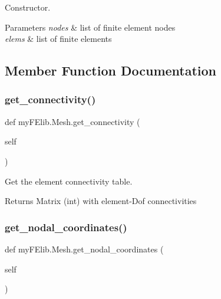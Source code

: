 Constructor. 


\begin{DoxyParams}{Parameters}
{\em nodes} & list of finite element nodes \\
\hline
{\em elems} & list of finite elements \\
\hline
\end{DoxyParams}


\subsection{Member Function Documentation}
\mbox{\label{classmyFElib_1_1Mesh_ac4e674a719553db6c87ef5ef354fcec2}} 
\subsubsection{\texorpdfstring{get\+\_\+connectivity()}{get\_connectivity()}}
{\footnotesize\ttfamily def my\+F\+Elib.\+Mesh.\+get\+\_\+connectivity (\begin{DoxyParamCaption}\item[{}]{self }\end{DoxyParamCaption})}



Get the element connectivity table. 

\begin{DoxyReturn}{Returns}
Matrix (int) with element-\/\+Dof connectivities 
\end{DoxyReturn}
\mbox{\label{classmyFElib_1_1Mesh_ae099773e290dd0b1476558bbf6f2272a}} 
\subsubsection{\texorpdfstring{get\+\_\+nodal\+\_\+coordinates()}{get\_nodal\_coordinates()}}
{\footnotesize\ttfamily def my\+F\+Elib.\+Mesh.\+get\+\_\+nodal\+\_\+coordinates (\begin{DoxyParamCaption}\item[{}]{self }\end{DoxyParamCaption})}



